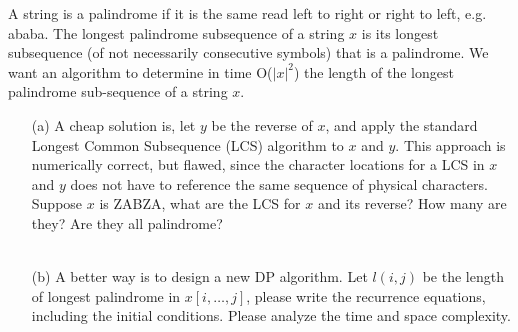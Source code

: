 \noindent {} 
A string is a palindrome if it is the same read left to right or right to left, e.g. ababa. The longest palindrome subsequence of a string $x$ is its longest subsequence (of not necessarily consecutive symbols) that is a palindrome. We want an algorithm to determine in time O($|x|^2$) the length of the longest palindrome sub-sequence of a string $x$.
\begin{itemize}
    \item[(a)] A cheap solution is, let $y$ be the reverse of $x$, and apply the standard Longest Common Subsequence (LCS) algorithm to $x$ and $y$. This approach is numerically correct, but flawed, since the character locations for a LCS in $x$ and $y$ does not have to reference the same sequence of physical characters. Suppose $x$ is ZABZA, what are the LCS for $x$ and its reverse? How many are they? Are they all palindrome? \\
    \\
    \item[(b)] A better way is to design a new DP algorithm. Let $l(i, j)$ be the length of longest palindrome in $x[i, \dots, j]$, please write the recurrence equations, including the initial conditions. Please analyze the time and space complexity. \\
\end{itemize}